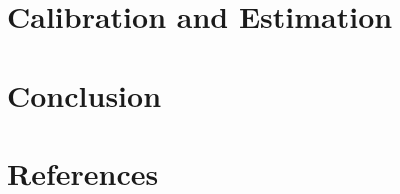 \documentclass{article}
\begin{document}
\section{Calibration and Estimation}\label{Calibration and Estimation}

\section{Conclusion}\label{Conclusion}

\section{References}\label{References}

\cite{Carroll_2000}
\cite{Carroll_1998}
\cite{Michaillat_2021}
\cite{Auclert_2021}
\cite{Mian_2020}
\cite{Kaplan_2018}
\cite{Auclert_2020}
\cite{Cagetti_2003}





\end{document}

